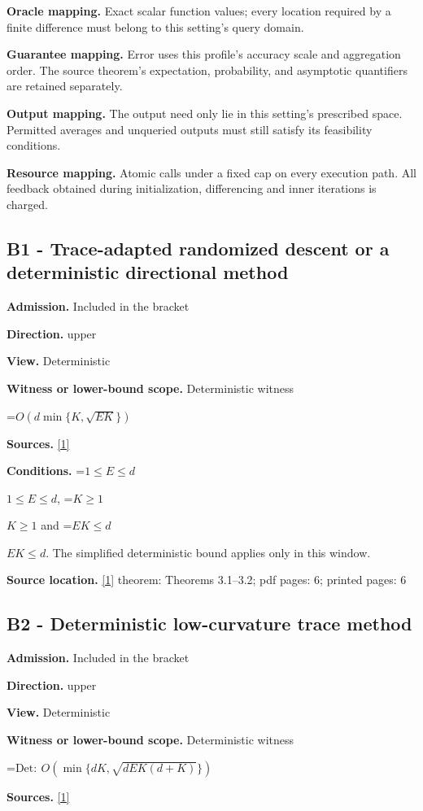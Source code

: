 \documentclass[10pt,a4paper]{article}
\newcommand{\AtlasMath}[1]{\par\begingroup\centering\setbox0=\hbox{$\displaystyle #1$}\ifdim\wd0>1.4\linewidth\typeout{ATLAS WIDE FORMULA: \the\wd0}\fi\ifdim\wd0>\linewidth\resizebox{\linewidth}{!}{\box0}\else\box0\fi\par\endgroup}
\newcommand{\AtlasInlineMath}[1]{\begingroup\setbox0=\hbox{$#1$}\ifdim\wd0>.4\linewidth\endgroup\AtlasMath{#1}\else\endgroup$#1$\fi}
\begin{document}
\textbf{Oracle mapping.} Exact scalar function values; every location required by a finite difference must belong to this setting's query domain.

\textbf{Guarantee mapping.} Error uses this profile's accuracy scale and aggregation order. The source theorem's expectation, probability, and asymptotic quantifiers are retained separately.

\textbf{Output mapping.} The output need only lie in this setting's prescribed space. Permitted averages and unqueried outputs must still satisfy its feasibility conditions.

\textbf{Resource mapping.} Atomic calls under a fixed cap on every execution path. All feedback obtained during initialization, differencing and inner iterations is charged.

\subsection{B1 - Trace-adapted randomized descent or a deterministic directional method}
\textbf{Admission.} Included in the bracket

\textbf{Direction.} upper

\textbf{View.} Deterministic

\textbf{Witness or lower-bound scope.} Deterministic witness

\AtlasMath{O(d\min\{K,\sqrt{EK}\})}
\textbf{Sources.} \href{https://arxiv.org/pdf/2610.27550v2}{[1]}

\textbf{Conditions.} \AtlasInlineMath{1\le E\le d}, \AtlasInlineMath{K\ge1} and \AtlasInlineMath{EK\le d}. The simplified deterministic bound applies only in this window.

\textbf{Source location.} \href{https://arxiv.org/pdf/2610.27550v2}{[1]} theorem: Theorems 3.1--3.2; pdf pages: 6; printed pages: 6

\subsection{B2 - Deterministic low-curvature trace method}
\textbf{Admission.} Included in the bracket

\textbf{Direction.} upper

\textbf{View.} Deterministic

\textbf{Witness or lower-bound scope.} Deterministic witness

\AtlasMath{\mathrm{Det}:\ O(\min\{dK,\sqrt{dEK(d+K)}\})}
\textbf{Sources.} \href{https://arxiv.org/pdf/2610.27550v2}{[1]}
\end{document}
